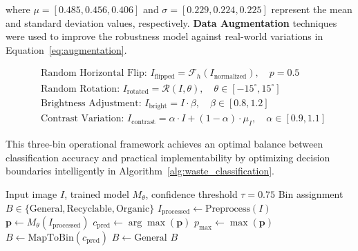 \documentclass[final,5p,times,twocolumn]{elsarticle}
\begin{document}
\noindent where $\mu = [0.485, 0.456, 0.406]$ and $\sigma = [0.229, 0.224, 0.225]$ represent the mean and standard deviation values, respectively. \noindent \textbf{Data Augmentation} techniques were used to improve the robustness model against real-world variations in Equation~\ref{eq:augmentation}.

\begin{equation}
\begin{aligned}
& \text{Random Horizontal Flip: } I_{\text{flipped}} = \mathcal{F}_h(I_{\text{normalized}}), \quad p = 0.5 \\
& \text{Random Rotation: } I_{\text{rotated}} = \mathcal{R}(I, \theta), \quad \theta \in [-15^\circ, 15^\circ] \\
& \text{Brightness Adjustment: } I_{\text{bright}} = I \cdot \beta, \quad \beta \in [0.8, 1.2] \\
& \text{Contrast Variation: } I_{\text{contrast}} = \alpha \cdot I + (1-\alpha) \cdot \mu_I, \quad \alpha \in [0.9, 1.1]
\end{aligned}
\label{eq:augmentation}
\end{equation}

This three-bin operational framework achieves an optimal balance between classification accuracy and practical implementability by optimizing decision boundaries intelligently in Algorithm~\ref{alg:waste_classification}.

\begin{algorithm}[ht]
\caption{Waste Classification And Bin Assignment}
\label{alg:waste_classification}
\begin{algorithmic}[1]
\REQUIRE Input image \(I\), trained model \(M_{\theta}\), confidence threshold \(\tau = 0.75\)
\ENSURE Bin assignment \(B \in \{\text{General}, \text{Recyclable}, \text{Organic}\}\)
\STATE \(I_{\text{processed}} \leftarrow \text{Preprocess}(I)\) 
\STATE \(\mathbf{p} \leftarrow M_{\theta}(I_{\text{processed}})\) 
\STATE \(c_{\text{pred}} \leftarrow \arg\max(\mathbf{p})\) 
\STATE \(p_{\text{max}} \leftarrow \max(\mathbf{p})\) 
    \STATE \(B \leftarrow \text{MapToBin}(c_{\text{pred}})\) 
\ELSE
    \STATE \(B \leftarrow \text{General}\) 
\ENDIF
\RETURN \(B\)
\end{algorithmic}
\end{algorithm}
\end{document}

